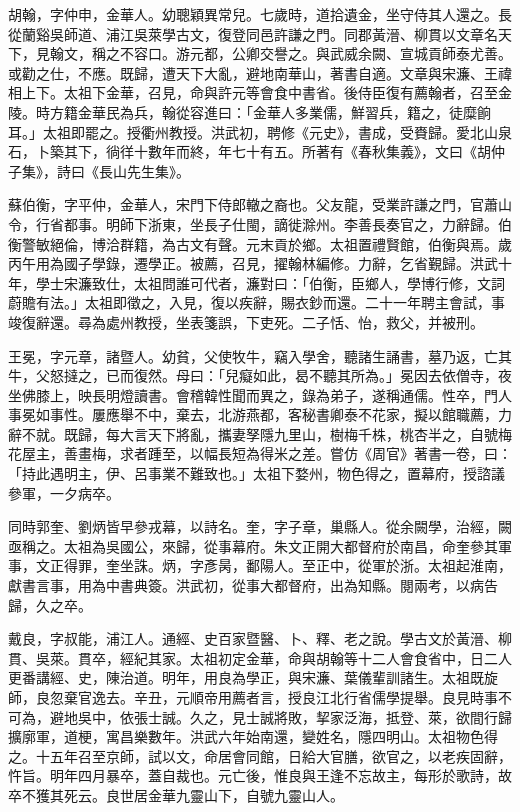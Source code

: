 \begin{pinyinscope}
胡翰，字仲申，金華人。幼聰穎異常兒。七歲時，道拾遺金，坐守侍其人還之。長從蘭谿吳師道、浦江吳萊學古文，復登同邑許謙之門。同郡黃溍、柳貫以文章名天下，見翰文，稱之不容口。游元都，公卿交譽之。與武威余闕、宣城貢師泰尤善。或勸之仕，不應。既歸，遭天下大亂，避地南華山，著書自適。文章與宋濂、王禕相上下。太祖下金華，召見，命與許元等會食中書省。後侍臣復有薦翰者，召至金陵。時方籍金華民為兵，翰從容進曰：「金華人多業儒，鮮習兵，籍之，徒糜餉耳。」太祖即罷之。授衢州教授。洪武初，聘修《元史》，書成，受賚歸。愛北山泉石，卜築其下，徜徉十數年而終，年七十有五。所著有《春秋集義》，文曰《胡仲子集》，詩曰《長山先生集》。

蘇伯衡，字平仲，金華人，宋門下侍郎轍之裔也。父友龍，受業許謙之門，官蕭山令，行省都事。明師下浙東，坐長子仕閩，謫徙滁州。李善長奏官之，力辭歸。伯衡警敏絕倫，博洽群籍，為古文有聲。元末貢於鄉。太祖置禮賢館，伯衡與焉。歲丙午用為國子學錄，遷學正。被薦，召見，擢翰林編修。力辭，乞省覲歸。洪武十年，學士宋濂致仕，太祖問誰可代者，濂對曰：「伯衡，臣鄉人，學博行修，文詞蔚贍有法。」太祖即徵之，入見，復以疾辭，賜衣鈔而還。二十一年聘主會試，事竣復辭還。尋為處州教授，坐表箋誤，下吏死。二子恬、怡，救父，并被刑。

王冕，字元章，諸暨人。幼貧，父使牧牛，竊入學舍，聽諸生誦書，墓乃返，亡其牛，父怒撻之，已而復然。母曰：「兒癡如此，曷不聽其所為。」冕因去依僧寺，夜坐佛膝上，映長明燈讀書。會稽韓性聞而異之，錄為弟子，遂稱通儒。性卒，門人事冕如事性。屢應舉不中，棄去，北游燕都，客秘書卿泰不花家，擬以館職薦，力辭不就。既歸，每大言天下將亂，攜妻孥隱九里山，樹梅千株，桃杏半之，自號梅花屋主，善畫梅，求者踵至，以幅長短為得米之差。嘗仿《周官》著書一卷，曰：「持此遇明主，伊、呂事業不難致也。」太祖下婺州，物色得之，置幕府，授諮議參軍，一夕病卒。

同時郭奎、劉炳皆早參戎幕，以詩名。奎，字子章，巢縣人。從余闕學，治經，闕亟稱之。太祖為吳國公，來歸，從事幕府。朱文正開大都督府於南昌，命奎參其軍事，文正得罪，奎坐誅。炳，字彥昺，鄱陽人。至正中，從軍於浙。太祖起淮南，獻書言事，用為中書典簽。洪武初，從事大都督府，出為知縣。閱兩考，以病告歸，久之卒。

戴良，字叔能，浦江人。通經、史百家暨醫、卜、釋、老之說。學古文於黃溍、柳貫、吳萊。貫卒，經紀其家。太祖初定金華，命與胡翰等十二人會食省中，日二人更番講經、史，陳治道。明年，用良為學正，與宋濂、葉儀輩訓諸生。太祖既旋師，良忽棄官逸去。辛丑，元順帝用薦者言，授良江北行省儒學提舉。良見時事不可為，避地吳中，依張士誠。久之，見士誠將敗，挈家泛海，抵登、萊，欲間行歸擴廓軍，道梗，寓昌樂數年。洪武六年始南還，變姓名，隱四明山。太祖物色得之。十五年召至京師，試以文，命居會同館，日給大官膳，欲官之，以老疾固辭，忤旨。明年四月暴卒，蓋自裁也。元亡後，惟良與王逢不忘故主，每形於歌詩，故卒不獲其死云。良世居金華九靈山下，自號九靈山人。


\end{pinyinscope}
